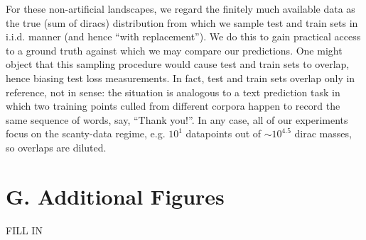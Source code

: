 \documentclass{article}
\begin{document}
    For these non-artificial landscapes, we regard the finitely much available
    data as the true (sum of diracs) distribution from which we sample test and
    train sets in i.i.d.  manner (and hence ``with replacement'').  We do this
    to gain practical access to a ground truth against which we may compare our
    predictions.  One might object that this sampling procedure would cause
    test and train sets to overlap, hence biasing test loss measurements.  In
    fact, test and train sets overlap only in reference, not in sense: the
    situation is analogous to a text prediction task in which two training
    points culled from different corpora happen to record the same sequence of
    words, say, ``Thank you!''.  In any case, all of our experiments
    focus on the scanty-data regime, e.g. $10^1$ datapoints out of $\sim
    10^{4.5}$ dirac masses, so overlaps are diluted. 

\section*{G. Additional Figures}
    {\color{moor} FILL IN}
\end{document}
